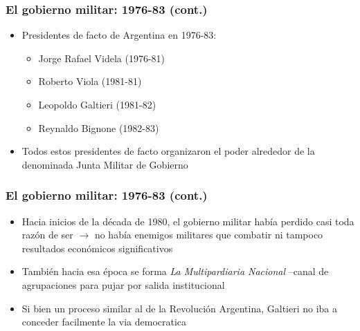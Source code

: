 \documentclass[14pt,aspectratio=169]{beamer}
\begin{document}
                \begin{frame}\frametitle{El gobierno militar: 1976-83 (cont.)}
                 \begin{itemize}\itemsep 5pt \medskip
                 \item Presidentes de facto de Argentina en 1976-83:
                   \begin{itemize}\itemsep 5pt\medskip
                   \item Jorge Rafael Videla (1976-81)
                   \item Roberto Viola (1981-81)
                   \item Leopoldo Galtieri (1981-82)
                     \item Reynaldo Bignone (1982-83)
                     \end{itemize}
                     \item Todos estos presidentes de facto
                       organizaron el poder alrededor de la denominada
                       Junta Militar de Gobierno 
                 \end{itemize}
               \end{frame}



                \begin{frame}\frametitle{El gobierno militar: 1976-83 (cont.)}
                 \begin{itemize}\itemsep 5pt \medskip
                 \item Hacia inicios de la década de 1980, el gobierno
                   militar había perdido casi toda razón de ser
                   $\longrightarrow$ no había enemigos militares que
                   combatir ni tampoco resultados económicos
                   significativos
                   \item También hacia esa época se forma
                     \textit{La Multipardiaria Nacional} --canal de
                     agrupaciones para pujar por salida institucional
                     \item Si bien un proceso similar al de la
                       Revolución Argentina, Galtieri no iba a
                       conceder facilmente la via democratica
                 \end{itemize}
               \end{frame}
\end{document}
